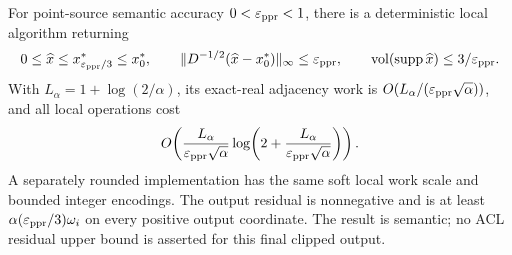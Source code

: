 \begin{theorem}
\label{thm:revisit-deterministic-gs}
For point-source semantic accuracy $0<\varepsilon_{\mathrm{ppr}}<1$, there is a deterministic
local algorithm returning
\[
 0\leq\widehat x\leq x^*_{\varepsilon_{\mathrm{ppr}}/3}\leq x_0^*,\qquad
 \|D^{-1/2}(\widehat x-x_0^*)\|_\infty\leq\varepsilon_{\mathrm{ppr}},
 \qquad \operatorname{vol}(\operatorname{supp}\widehat x)\leq3/\varepsilon_{\mathrm{ppr}}.
\]
With $L_\alpha=1+\log(2/\alpha)$, its exact-real adjacency work is
$O(L_\alpha/(\varepsilon_{\mathrm{ppr}}\sqrt\alpha))$, and all local operations cost
\[
 O\!\left(\frac{L_\alpha}{\varepsilon_{\mathrm{ppr}}\sqrt\alpha}
       \log\!\left(2+\frac{L_\alpha}{\varepsilon_{\mathrm{ppr}}\sqrt\alpha}\right)\right).
\]
A separately rounded implementation has the same soft local work scale
and bounded integer encodings. The output residual is nonnegative and is
at least $\alpha(\varepsilon_{\mathrm{ppr}}/3)\omega_i$ on every positive output coordinate.
The result is semantic; no ACL residual upper bound is asserted for this
final clipped output.
\end{theorem}
